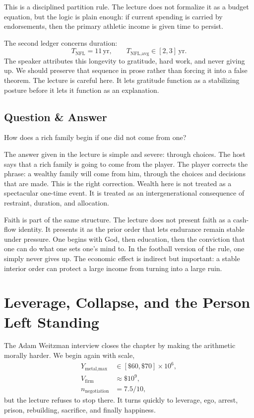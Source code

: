This is a disciplined partition rule. The lecture does not formalize it as a budget equation, but the logic is plain enough: if current spending is carried by endorsements, then the primary athletic income is given time to persist.

The second ledger concerns duration:
\begin{equation}
T_{\text{NFL}}=11\,\mathrm{yr},\qquad
T_{\text{NFL,avg}}\in[2,3]\,\mathrm{yr}.
\end{equation}
The speaker attributes this longevity to gratitude, hard work, and never giving up. We should preserve that sequence in prose rather than forcing it into a false theorem. The lecture is careful here. It lets gratitude function as a stabilizing posture before it lets it function as an explanation.

\subsection{Question \& Answer}

How does a rich family begin if one did not come from one?

The answer given in the lecture is simple and severe: through choices. The host says that a rich family is going to come from the player. The player corrects the phrase: a wealthy family will come from him, through the choices and decisions that are made. This is the right correction. Wealth here is not treated as a spectacular one-time event. It is treated as an intergenerational consequence of restraint, duration, and allocation.

Faith is part of the same structure. The lecture does not present faith as a cash-flow identity. It presents it as the prior order that lets endurance remain stable under pressure. One begins with God, then education, then the conviction that one can do what one sets one's mind to. In the football version of the rule, one simply never gives up. The economic effect is indirect but important: a stable interior order can protect a large income from turning into a large ruin.

\section{Leverage, Collapse, and the Person Left Standing}

The Adam Weitzman interview closes the chapter by making the arithmetic morally harder. We begin again with scale,
\begin{align}
Y_{\text{metal,max}}&\in[\$60,\$70]\times 10^6,\\
V_{\text{firm}}&\approx \$10^9,\\
n_{\text{negotiation}}&=7.5/10,
\end{align}
but the lecture refuses to stop there. It turns quickly to leverage, ego, arrest, prison, rebuilding, sacrifice, and finally happiness.

